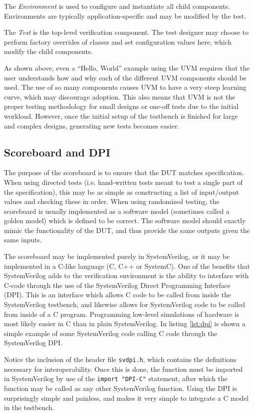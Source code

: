 \documentclass[conference]{IEEEtran}
\newcommand{\SV}{SystemVerilog\xspace}
\begin{document}
    The \textit{Environment} is used to configure and instantiate all child components. Environments are typically application-specific and may be modified by the test.
    
    The \textit{Test} is the top-level verification component. The test designer may choose to perform factory overrides of classes and set configuration values here, which modify the child components.

As shown above, even a ``Hello, World'' example using the UVM requires that the user understands how and why each of the different UVM components should be used. The use of so many components causes UVM to have a very steep learning curve, which may discourage adoption. This also means that UVM is not the proper testing methodology for small designs or one-off tests due to the initial workload.
However, once the initial setup of the testbench is finished for large and complex designs, generating new tests becomes easier.

\subsection{Scoreboard and DPI}
The purpose of the scoreboard is to ensure that the DUT matches specification. When using directed tests (i.e. hand-written tests meant to test a single part of the specification), this may be as simple as constructing a list of input/output values and checking these in order. When using randomized testing, the scoreboard is usually implemented as a software model (sometimes called a golden model) which is defined to be correct. The software model should exactly mimic the functionality of the DUT, and thus provide the same outputs given the same inputs. 

The scoreboard may be implemented purely in SystemVerilog, or it may be implemented in a C-like language (C, C++ or SystemC). One of the benefits that \SV adds to the verification environment is the ability to interface with C-code through the use of the \SV Direct Programming Interface (DPI). This is an interface which allows C code to be called from inside the \SV testbench, and likewise allows for \SV code to be called from inside of a C program. Programming low-level simulations of hardware is most likely easier in C than in plain \SV. In listing \ref{lst:dpi} is shown a simple example of some SystemVerilog code calling C code through the \SV DPI. 

Notice the inclusion of the header file \texttt{svdpi.h}, which contains the definitions necessary for interoperability. Once this is done, the function must be imported in \SV by use of the \texttt{import "DPI-C"} statement, after which the function may be called as any other \SV function. Using the DPI is surprisingly simple and painless, and makes it very simple to integrate a C model in the testbench.
\end{document}
